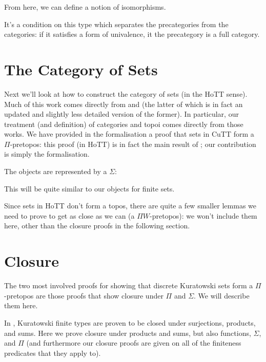 From here, we can define a notion of isomorphisms.
\begin{agdalisting}
\end{agdalisting}
It's a condition on this type which separates the precategories from the
categories: if it satisfies a form of univalence, it the precategory is a full
category.
\begin{agdalisting}
\end{agdalisting}
\section{The Category of Sets}
Next we'll look at how to construct the category of sets (in the HoTT sense).
Much of this work comes directly from \citet{rijkeSetsHomotopyType2015} and
\citet[chapter 10]{hottbook} (the latter of which is in fact an updated and
slightly less detailed version of the former).
In particular, our treatment (and definition) of categories and topoi comes
directly from those works.
We have provided in the formalisation a proof that sets in CuTT form a
\(\Pi\)-pretopos: this proof (in HoTT) is in fact the main result of
\citet{rijkeSetsHomotopyType2015}; our contribution is simply the formalisation.

The objects are represented by a \(\Sigma\):
\begin{agdalisting*}
\end{agdalisting*}
This will be quite similar to our objects for finite sets.

Since sets in HoTT don't form a topos, there are quite a few smaller lemmas we
need to prove to get as close as we can (a \(\Pi W\)-pretopos): we won't include
them here, other than the closure proofs in the following section.
\section{Closure}
The two most involved proofs for showing that discrete Kuratowski sets form a
\(\Pi\)-pretopos are those proofs that show closure under \(\Pi\) and
\(\Sigma\).
We will describe them here.

In \cite[Theorem 4.21]{fruminFiniteSetsHomotopy2018}, Kuratowski finite types
are proven to be closed under surjections, products, and sums.
Here we prove closure under products and sums, but also functions, \(\Sigma\),
and \(\Pi\) (and furthermore our closure proofs are given on all of the
finiteness predicates that they apply to).
